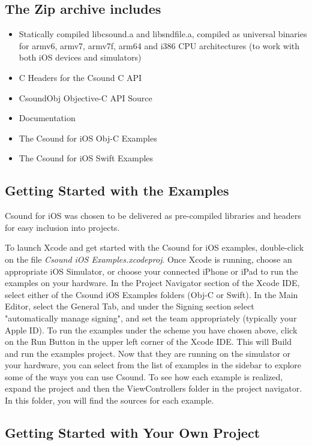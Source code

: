 \documentclass[11pt]{article}
\begin{document}
\subsection{The Zip archive includes}

\begin{itemize}
\item Statically compiled libcsound.a and libsndfile.a, compiled as universal binaries for armv6, armv7, armv7f, arm64 and i386 CPU architectures (to work with both iOS devices and simulators)
\item C Headers for the Csound C API
\item CsoundObj Objective-C API Source
\item Documentation
\item The Csound for iOS Obj-C Examples
\item The Csound for iOS Swift Examples
\end{itemize}

\subsection{Getting Started with the Examples}

Csound for iOS was chosen to be delivered as pre-compiled libraries and headers for easy inclusion into projects.  

To launch Xcode and get started with the Csound for iOS examples, double-click on the file \textit{Csound iOS Examples.xcodeproj}. Once Xcode is running, choose an appropriate iOS Simulator, or choose your connected iPhone or iPad to run the examples on your hardware. In the Project Navigator section of the Xcode IDE, select either of the Csound iOS Examples folders (Obj-C or Swift).  In the Main Editor, select the General Tab, and under the Signing section select "automatically manage signing", and set the team appropriately (typically your Apple ID).  To run the examples under the scheme you have chosen above, click on the Run Button in the upper left corner of the Xcode IDE. This will Build and run the examples project. Now that they are running on the simulator or your hardware, you can select from the list of examples in the sidebar to explore some of the ways you can use Csound. To see how each example is realized, expand the project and then the ViewControllers folder in the project navigator. In this folder, you will find the sources for each example.

\subsection{Getting Started with Your Own Project}
\end{document}
